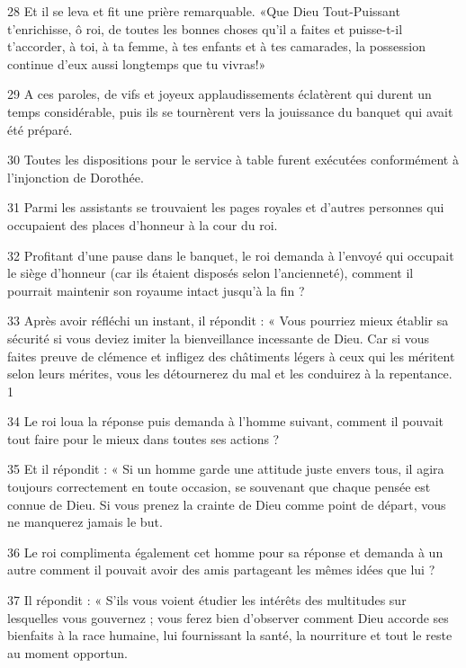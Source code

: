 \par 28 Et il se leva et fit une prière remarquable. «Que Dieu Tout-Puissant t'enrichisse, ô roi, de toutes les bonnes choses qu'il a faites et puisse-t-il t'accorder, à toi, à ta femme, à tes enfants et à tes camarades, la possession continue d'eux aussi longtemps que tu vivras!»

\par 29 A ces paroles, de vifs et joyeux applaudissements éclatèrent qui durent un temps considérable, puis ils se tournèrent vers la jouissance du banquet qui avait été préparé.

\par 30 Toutes les dispositions pour le service à table furent exécutées conformément à l'injonction de Dorothée.

\par 31 Parmi les assistants se trouvaient les pages royales et d'autres personnes qui occupaient des places d'honneur à la cour du roi.

\par 32 Profitant d'une pause dans le banquet, le roi demanda à l'envoyé qui occupait le siège d'honneur (car ils étaient disposés selon l'ancienneté), comment il pourrait maintenir son royaume intact jusqu'à la fin ?

\par 33 Après avoir réfléchi un instant, il répondit : « Vous pourriez mieux établir sa sécurité si vous deviez imiter la bienveillance incessante de Dieu. Car si vous faites preuve de clémence et infligez des châtiments légers à ceux qui les méritent selon leurs mérites, vous les détournerez du mal et les conduirez à la repentance. 1

\par 34 Le roi loua la réponse puis demanda à l'homme suivant, comment il pouvait tout faire pour le mieux dans toutes ses actions ?

\par 35 Et il répondit : « Si un homme garde une attitude juste envers tous, il agira toujours correctement en toute occasion, se souvenant que chaque pensée est connue de Dieu. Si vous prenez la crainte de Dieu comme point de départ, vous ne manquerez jamais le but.

\par 36 Le roi complimenta également cet homme pour sa réponse et demanda à un autre comment il pouvait avoir des amis partageant les mêmes idées que lui ?

\par 37 Il répondit : « S'ils vous voient étudier les intérêts des multitudes sur lesquelles vous gouvernez ; vous ferez bien d'observer comment Dieu accorde ses bienfaits à la race humaine, lui fournissant la santé, la nourriture et tout le reste au moment opportun.

